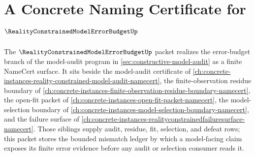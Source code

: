\chapter{A Concrete Naming Certificate for $\RealityConstrainedModelErrorBudgetUp$}
\label{ch:concrete-instances-reality-constrained-model-error-budget-namecert}

The $\RealityConstrainedModelErrorBudgetUp$ packet realizes the error-budget branch of the model-audit program in \autoref{sec:constructive-model-audit} as a finite NameCert surface. It sits beside the model-audit certificate of \autoref{ch:concrete-instances-reality-constrained-model-audit-namecert}, the finite-observation residue boundary of \autoref{ch:concrete-instances-finite-observation-residue-boundary-namecert}, the open-fit packet of \autoref{ch:concrete-instances-open-fit-packet-namecert}, the model-selection boundary of \autoref{ch:concrete-instances-model-selection-boundary-namecert}, and the failure surface of \autoref{ch:concrete-instances-realityconstrainedfailuresurface-namecert}. Those siblings supply audit, residue, fit, selection, and defeat rows; this packet stores the bounded mismatch ledger by which a model-facing claim exposes its finite error evidence before any audit or selection consumer reads it.

